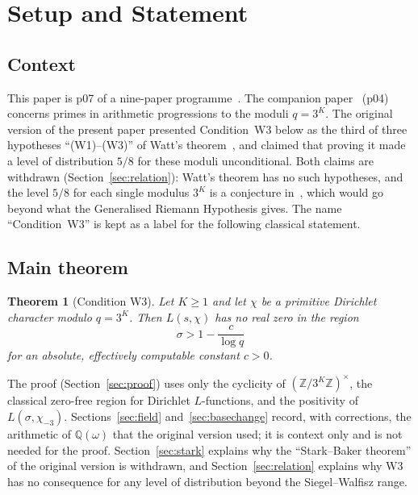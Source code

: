 \documentclass[12pt]{amsart}
\theoremstyle{plain}
\newtheorem{theorem}{Theorem}[section]
\theoremstyle{definition}
\theoremstyle{remark}
\newcommand{\Z}{\mathbb{Z}}
\newcommand{\Q}{\mathbb{Q}}
\newcommand{\Qomega}{\Q(\omega)}
\begin{document}
\section{Setup and Statement}

\subsection{Context}

This paper is p07 of a nine-paper programme~\cite{WakilCF}. The companion
paper~\cite{WakilEisenstein} (p04) concerns primes in arithmetic progressions
to the moduli $q = 3^K$. The original version of the present paper presented
Condition~W3 below as the third of three hypotheses ``(W1)--(W3)'' of Watt's
theorem~\cite{Watt1995}, and claimed that proving it made a level of
distribution $5/8$ for these moduli unconditional. Both claims are withdrawn
(Section~\ref{sec:relation}): Watt's theorem has no such hypotheses, and the
level $5/8$ for each single modulus $3^K$ is a conjecture
in~\cite{WakilEisenstein}, which would go beyond what the Generalised Riemann
Hypothesis gives. The name ``Condition~W3'' is kept as a label for the
following classical statement.

\subsection{Main theorem}

\begin{theorem}[Condition W3]
\label{thm:W3}
Let $K \geq 1$ and let $\chi$ be a primitive Dirichlet character modulo
$q = 3^K$. Then $L(s,\chi)$ has no real zero in the region
\[
  \sigma > 1 - \frac{c}{\log q}
\]
for an absolute, effectively computable constant $c > 0$.
\end{theorem}

The proof (Section~\ref{sec:proof}) uses only the cyclicity of
$(\Z/3^K\Z)^\times$, the classical zero-free region for Dirichlet
$L$-functions, and the positivity of $L(\sigma,\chi_{-3})$.
Sections~\ref{sec:field} and~\ref{sec:basechange} record, with corrections,
the arithmetic of $\Qomega$ that the original version used; it is context
only and is not needed for the proof. Section~\ref{sec:stark} explains why
the ``Stark--Baker theorem'' of the original version is withdrawn, and
Section~\ref{sec:relation} explains why W3 has no consequence for any level
of distribution beyond the Siegel--Walfisz range.
\end{document}
